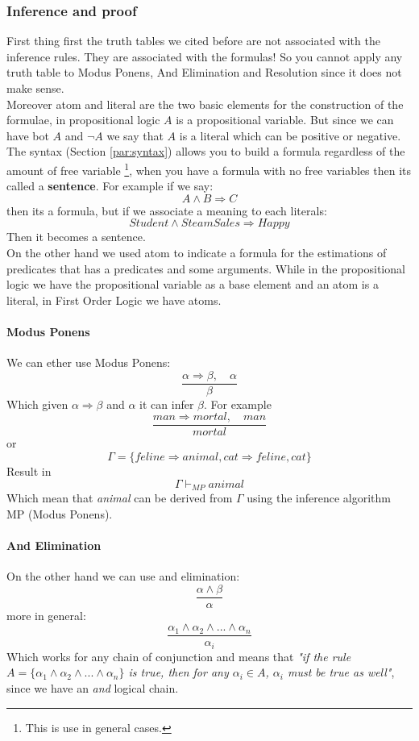 \documentclass[10pt,a4paper]{article}
\begin{document}
\subsubsection{Inference and proof}
\label{subsec:modusPonens}

First thing first the truth tables we cited before are not associated with the inference rules. They are associated with the formulas! So you cannot apply any truth table to Modus Ponens, And Elimination and Resolution since it does not make sense.\\

Moreover atom and literal are the two basic elements for the construction of the formulae, in propositional logic $A$ is a propositional variable. But since we can have bot $A$ and $\neg A$ we say that $A$ is a literal which can be positive or negative.\\

The syntax (Section \ref{par:syntax}) allows you to build a formula regardless of the amount of free variable \footnote{This is use in general cases.}, when you have a formula with no free variables then its called a \textbf{sentence}. For example if we say:
\[A\wedge B \Rightarrow C\]
then its a formula, but if we associate a meaning to each literals:
\[Student \wedge SteamSales \Rightarrow Happy\]
Then it becomes a sentence.\\

On the other hand we used atom to indicate a formula for the estimations of predicates that has a predicates and some arguments. While in the propositional logic we have the propositional variable as a base element and an atom is a literal, in First Order Logic we have atoms.


\paragraph{Modus Ponens} We can ether use Modus Ponens:
\[\frac{\alpha \Rightarrow \beta,\quad \alpha}{\beta}\]
Which given $\alpha \Rightarrow \beta$ and $\alpha$ it can infer $\beta$. For example
\[\frac{man \Rightarrow mortal,\quad man}{mortal}\]
or
\[\Gamma =\lbrace feline \Rightarrow animal, cat \Rightarrow feline, cat \rbrace\]
Result in 
\[\Gamma \vdash_{MP} animal\]
Which mean that \textit{animal} can be derived from $\Gamma$ using the inference algorithm MP (Modus Ponens).\\

\paragraph{And Elimination}On the other hand we can use and elimination:
\[\frac{\alpha\wedge\beta}{\alpha}\]
more in general:
\[\frac{\alpha_1\wedge\alpha_2\wedge...\wedge \alpha_n}{\alpha_i}\]
Which works for any chain of conjunction and means that \textit{"if the rule $A=\lbrace\alpha_1\wedge\alpha_2\wedge...\wedge \alpha_n\rbrace$ is true, then for any $\alpha_i \in A$, $\alpha_i$ must be true as well"}, since we have an \textit{and} logical chain.\\
\end{document}
